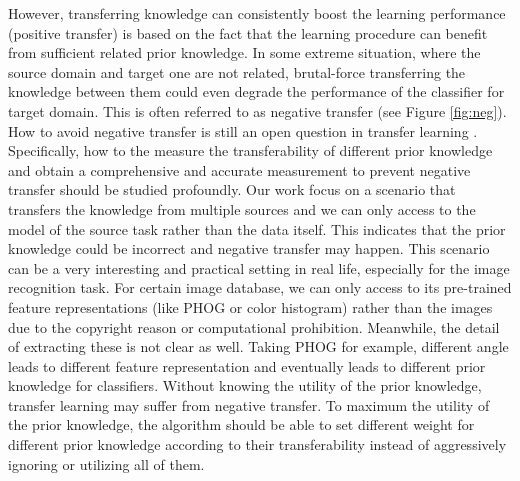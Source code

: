 However, transferring knowledge can consistently boost the learning performance (positive transfer) is based on the fact that the learning procedure can benefit from sufficient related prior knowledge. In some extreme situation, where the source domain and target one are not related, brutal-force transferring the knowledge between them could even degrade the performance of the classifier for target domain. This is often referred to as negative transfer (see Figure \ref{fig:neg}). How to avoid negative transfer is still an open question in transfer learning \cite{Lu201514}. Specifically, how to the measure the transferability of different prior knowledge and obtain a comprehensive and accurate measurement to prevent negative transfer should be studied profoundly. Our work focus on a scenario that transfers the knowledge from multiple sources and we can only access to the model of the source task rather than the data itself. This indicates that the prior knowledge could be incorrect and negative transfer may happen. This scenario can be a very interesting and practical setting in real life, especially for the image recognition task. For certain image database, we can only access to its pre-trained feature representations (like PHOG or color histogram) rather than the images due to the copyright reason or computational prohibition. Meanwhile, the detail of extracting these is not clear as well. Taking PHOG for example, different angle leads to different feature representation and eventually leads to different prior knowledge for classifiers. Without knowing the utility of the prior knowledge, transfer learning may suffer from negative transfer. To maximum the utility of the prior knowledge, the algorithm should be able to set different weight for different prior knowledge according to their transferability instead of aggressively ignoring or utilizing all of them.

